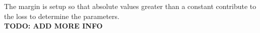 \documentclass[11pt]{scrartcl} %
\begin{document}
The margin is setup so that absolute values greater than a constant contribute to the loss to determine
the parameters.\\

\textbf{TODO: ADD MORE INFO}

\medskip

\printbibliography






\end{document}
